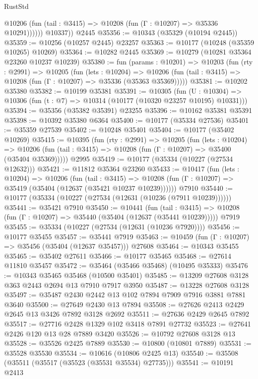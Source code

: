 \begin{lexlean}{RustStd}
\begin{coremodule}
              @10206 (fun (tail : @3415) => @10208 (fun (Γ : @10207) => @35336 @10291))))))
        @10337))
    @2445
@35356 := @10343 (@35329 (@10194 @2445))
@35359 := @10256 (@10257 @2445) @23257
@35363 := @10177 (@10248 (@35359 @10265) @10269)
@35364 := @10282 @2445
@35369 := @10279 (@10281 @35364 @23260 @10237 @10239)
@35380 := fun (params : @10201) =>
  @10203
    (fun (rty : @2991) =>
    @10205
      (fun (lets : @10204) =>
      @10206 (fun (tail : @3415) => @10208 (fun (Γ : @10207) => @35336 (@35363 @35369)))))
@35381 := @10202 @35380
@35382 := @10199 @35381
@35391 := @10305
    (fun (U : @10304) => @10306 (fun (t : @7) => @10314 (@10177 (@10320 @23257 @10195) @10331)))
@35394 := @35356 (@35382 @35391) @23255
@35396 := @10162 @35381 @35391
@35398 := @10392 @35380 @6364
@35400 := @10177 (@35334 @27536)
@35401 := @35359 @27539
@35402 := @10248 @35401
@35404 := @10177 (@35402 @10269)
@35415 := @10395
    (fun (rty : @2991) =>
    @10205
      (fun (lets : @10204) =>
      @10206 (fun (tail : @3415) => @10208 (fun (Γ : @10207) => @35400 (@35404 @35369)))))
    @2995
@35419 := @10177 (@35334 (@10227 (@27534 @12632)))
@35421 := @11812 @35364 @23260
@35433 := @10417
    (fun (lets : @10204) =>
    @10206
      (fun (tail : @3415) =>
      @10208 (fun (Γ : @10207) => @35419 (@35404 (@12637 (@35421 @10237 @10239))))))
    @7910
@35440 := @10177 (@35334 (@10227 (@27534 (@12631 (@10236 (@7911 @10239))))))
@35441 := @35421 @7910
@35450 := @10441
    (fun (tail : @3415) => @10208 (fun (Γ : @10207) => @35440 (@35404 (@12637 (@35441 @10239)))))
    @7919
@35455 := @35334 (@10227 (@27534 (@12631 (@10236 @7920))))
@35456 := @10177 @35455
@35457 := @35441 @7919
@35463 := @10459 (fun (Γ : @10207) => @35456 (@35404 (@12637 @35457))) @27608
@35464 := @10343 @35455
@35465 := @35402 @27611
@35466 := @10177 @35465
@35468 := @27614 @11810 @35457
@35472 := @35464 (@35466 @35468) (@10495 @35333)
@35476 := @10343 @35465 @35468 (@10500 @35401)
@35485 := @13209 @27608 @3128 @363 @2443 @2694 @13 @7910 @7917 @3950
@35487 := @13228 @27608 @3128
@35497 := @35487 @2430 @2442 @13 @102 @7894 @7909 @7916 @3881 @7881 @3640
@35500 := @27649 @2430 @13 @7894
@35508 := @27626 @2413 @2429 @2645 @13 @3426 @7892 @3128 @2692
@35511 := @27636 @2429 @2645 @7892
@35517 := @27716 @2428 @1329 @102 @3418 @7891 @27732
@35523 := @27641 @2426 @120 @13 @28 @7889 @3420
@35526 := @10792 @27608 @3128 @13
@35528 := @35526 @2425 @7889
@35530 := @10800 (@10801 @7889)
@35531 := @35528 @35530
@35534 := @10616 (@10806 @2425 @13)
@35540 := @35508 (@35511 (@35517 (@35523 (@35531 @35534) @27735)))
@35541 := @10191 @2413

\end{coremodule}
\end{lexlean}
